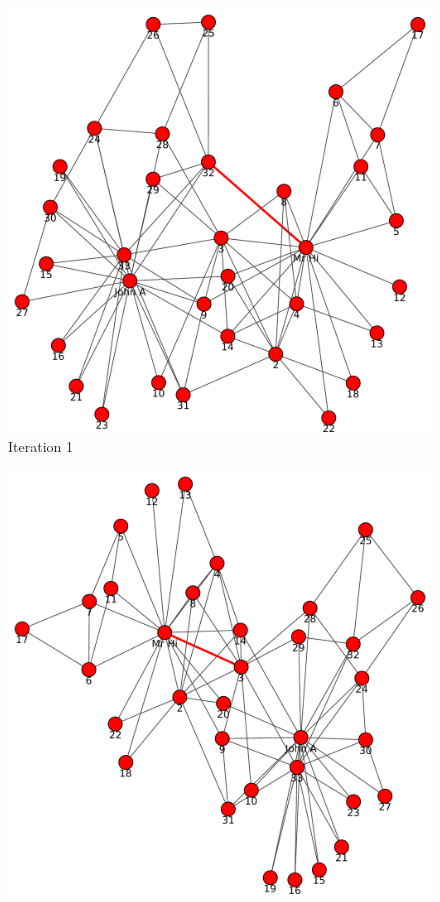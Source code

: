 \begin{itemize}
\begin{figure}[h!]
\begin{center}
\includegraphics[scale=0.55, keepaspectratio=true]{figures/graphs/EdgeHighlightedGraph1.pdf}
\caption{Iteration 1}
\label{fig:q1fig1}
\end{center}
\end{figure}
\newpage
\begin{figure}[h!]
\begin{center}
\includegraphics[scale=0.55, keepaspectratio=true]{figures/graphs/EdgeHighlightedGraph2.pdf}

\end{center}
\end{figure}
\end{itemize}
